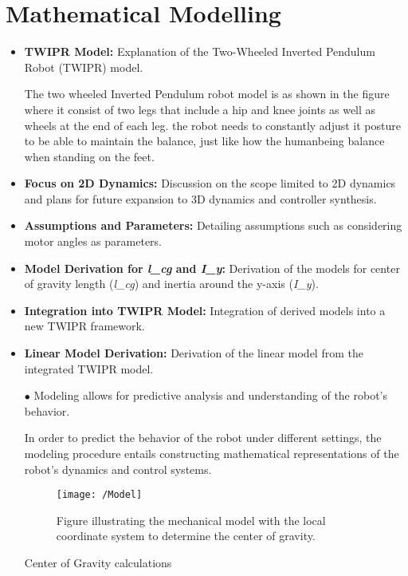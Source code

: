 \section{Mathematical Modelling}
\begin{itemize}
	\item \textbf{TWIPR Model:} Explanation of the Two-Wheeled Inverted Pendulum Robot (TWIPR) model.
	
	
	The two wheeled Inverted Pendulum robot model is as shown in the figure where it consist of two legs that include a hip and knee joints as well as wheels at the end of each leg.
	the robot needs to constantly adjust it posture to be able to maintain the balance, just like how the humanbeing balance when standing on the feet.
	
	\item \textbf{Focus on 2D Dynamics:} Discussion on the scope limited to 2D dynamics and plans for future expansion to 3D dynamics and controller synthesis.
	\item \textbf{Assumptions and Parameters:} Detailing assumptions such as considering motor angles as parameters.
	\item \textbf{Model Derivation for \textit{l\_cg} and \textit{I\_y}:} Derivation of the models for center of gravity length (\textit{l\_cg}) and inertia around the y-axis (\textit{I\_y}).
	\item \textbf{Integration into TWIPR Model:} Integration of derived models into a new TWIPR framework.
	\item \textbf{Linear Model Derivation:} Derivation of the linear model from the integrated TWIPR model.
	
	$\bullet$ Modeling allows for predictive analysis and understanding of the robot's behavior.
	
	In order to predict the behavior of the robot under different settings, the modeling procedure entails constructing mathematical representations of the robot's dynamics and control systems.
	
	
	
	\begin{figure}[h]
		\centering
		\texttt{[image: /Model]}
		\caption[Mechanical model with the local coordinate system]{Figure illustrating the mechanical model with the local coordinate system to determine the center of gravity.}
		\label{Mechanical model with the local coordinate system}
	\end{figure}
	
	Center of Gravity calculations 

\end{itemize}
